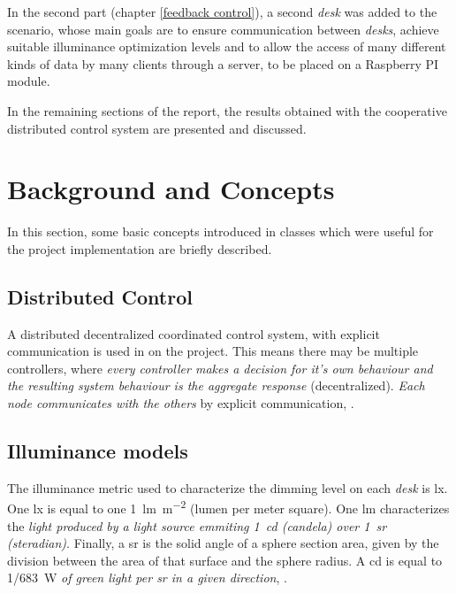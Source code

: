 \documentclass[english,fira]{ist-report}
\begin{document}
In the second part (chapter \ref{feedback control}), a second \textit{desk} was added to the scenario, whose main goals are to ensure communication between \textit{desks}, achieve suitable illuminance optimization levels and to allow the access of many different kinds of data by many clients through a server, to be placed on a Raspberry PI module.

In the remaining sections of the report, the results obtained with the cooperative distributed control system are presented and discussed.

\pagebreak
\section{Background and Concepts} \label{background_concepts}

In this section, some basic concepts introduced in classes which were useful for the project implementation are briefly described.

\subsection{Distributed Control}

A distributed decentralized coordinated control system, with explicit communication is used in on the project. This means there may be multiple controllers, where \textit{every controller makes a decision for it's own behaviour and the resulting system behaviour is the aggregate response} (decentralized). \textit{Each node communicates with the others} by explicit communication, \cite{slides}. 

\subsection{Illuminance models}\label{sec:light}

The illuminance metric used to characterize the dimming level on each \textit{desk} is \si{\lux}. One \si{\lux} is equal to one \SI{1}{\lumen\per\meter\squared} (lumen per meter square). One \si{\lumen} characterizes the \textit{light produced by a light source emmiting \SI{1}{\candela} (candela) over \SI{1}{\steradian} (steradian)}. Finally, a \si{\steradian} is the solid angle of a sphere section area, given by the division between the area of that surface and the sphere radius. A \si{\candela} is equal to \SI[quotient-mode=fraction]{1/683}{W} \textit{of green light per \si{\steradian} in a given direction}, \cite{slides}.
\end{document}
